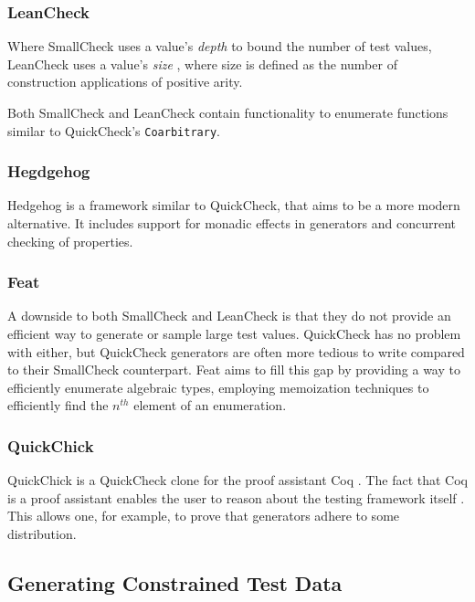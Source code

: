 \documentclass[a4paper,msc,twosized=semi]{uustthesis}
\begin{document}
\subsubsection{LeanCheck} 

  Where SmallCheck uses a value's \textit{depth} to bound the number of test values, 
  LeanCheck uses a value's \textit{size} \cite{matela2017tools}, where size is defined 
  as the number of construction applications of positive arity.

  Both SmallCheck and LeanCheck contain functionality to enumerate functions similar 
  to QuickCheck's \texttt{Coarbitrary}. 

\subsubsection{Hegdgehog} 
  
  Hedgehog \cite{hedgehog} is a framework similar to QuickCheck, that aims to be a more modern alternative. It includes support for monadic effects in generators and concurrent checking of properties.

\subsubsection{Feat} 
  
  A downside to both SmallCheck and LeanCheck is that they do not 
  provide an efficient way to generate or sample large test values. QuickCheck has no 
  problem with either, but QuickCheck generators are often more tedious to write 
  compared to their SmallCheck counterpart. Feat \cite{duregaard2013feat} aims to fill 
  this gap by providing a way to efficiently enumerate algebraic types, employing 
  memoization techniques to efficiently find the $n^{th}$ element of an enumeration. 

\subsubsection{QuickChick} 
  
  QuickChick is a QuickCheck clone for the proof assistant Coq 
  \cite{denes2014quickchick}. The fact that Coq is a proof assistant enables the user 
  to reason about the testing framework itself \cite{paraskevopoulou2015foundational}. 
  This allows one, for example, to prove that generators adhere to some distribution.  

\subsection{Generating Constrained Test Data}\label{genconstrainedtd}
\end{document}

